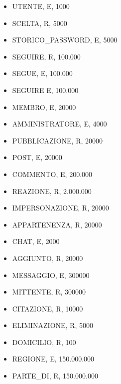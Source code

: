 \documentclass[a4paper,12pt]{report}
\begin{document}
\begin{itemize}
  \item UTENTE, E, 1000
  \item SCELTA, R, 5000
  \item STORICO\_PASSWORD, E, 5000
  \item SEGUIRE, R, 100.000
  \item SEGUE, E, 100.000
  \item SEGUIRE E, 100.000
  \item MEMBRO, E, 20000
  \item AMMINISTRATORE, E, 4000
  \item PUBBLICAZIONE, R, 20000
  \item POST, E, 20000
  \item COMMENTO, E, 200.000
  \item REAZIONE, R, 2.000.000
  \item IMPERSONAZIONE, R, 20000
  \item APPARTENENZA, R, 20000
  \item CHAT, E, 2000 
  \item AGGIUNTO, R, 20000 
  \item MESSAGGIO, E, 300000
  \item MITTENTE, R, 300000
  \item CITAZIONE, R, 10000
  \item ELIMINAZIONE, R, 5000
  \item DOMICILIO, R, 100
  \item REGIONE, E, 150.000.000
  \item PARTE\_DI, R, 150.000.000

\end{itemize}
\end{document}

